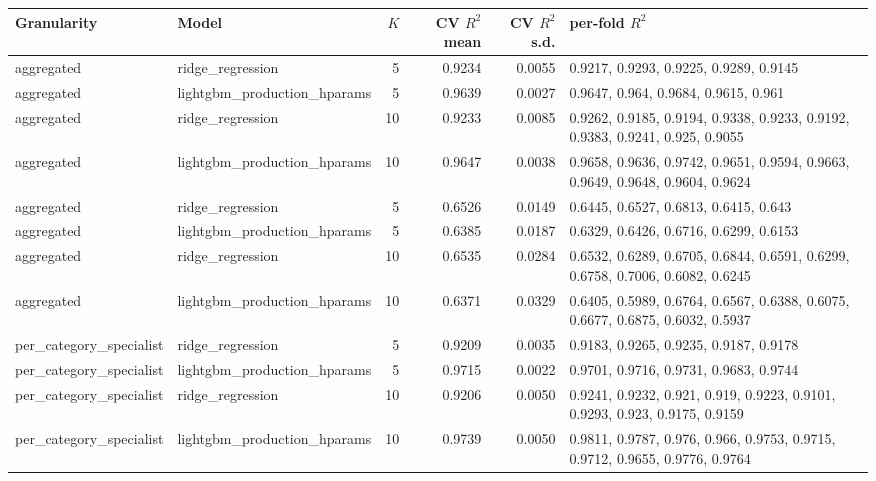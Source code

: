 \begin{tabular}{llrrrl}
\toprule
Granularity & Model & $K$ & CV $R^2$ mean & CV $R^2$ s.d. & per-fold $R^2$ \\
\midrule
aggregated & ridge\_regression & 5 & 0.9234 & 0.0055 & {\scriptsize 0.9217, 0.9293, 0.9225, 0.9289, 0.9145} \\
aggregated & lightgbm\_production\_hparams & 5 & 0.9639 & 0.0027 & {\scriptsize 0.9647, 0.964, 0.9684, 0.9615, 0.961} \\
aggregated & ridge\_regression & 10 & 0.9233 & 0.0085 & {\scriptsize 0.9262, 0.9185, 0.9194, 0.9338, 0.9233, 0.9192, 0.9383, 0.9241, 0.925, 0.9055} \\
aggregated & lightgbm\_production\_hparams & 10 & 0.9647 & 0.0038 & {\scriptsize 0.9658, 0.9636, 0.9742, 0.9651, 0.9594, 0.9663, 0.9649, 0.9648, 0.9604, 0.9624} \\
aggregated & ridge\_regression & 5 & 0.6526 & 0.0149 & {\scriptsize 0.6445, 0.6527, 0.6813, 0.6415, 0.643} \\
aggregated & lightgbm\_production\_hparams & 5 & 0.6385 & 0.0187 & {\scriptsize 0.6329, 0.6426, 0.6716, 0.6299, 0.6153} \\
aggregated & ridge\_regression & 10 & 0.6535 & 0.0284 & {\scriptsize 0.6532, 0.6289, 0.6705, 0.6844, 0.6591, 0.6299, 0.6758, 0.7006, 0.6082, 0.6245} \\
aggregated & lightgbm\_production\_hparams & 10 & 0.6371 & 0.0329 & {\scriptsize 0.6405, 0.5989, 0.6764, 0.6567, 0.6388, 0.6075, 0.6677, 0.6875, 0.6032, 0.5937} \\
per\_category\_specialist & ridge\_regression & 5 & 0.9209 & 0.0035 & {\scriptsize 0.9183, 0.9265, 0.9235, 0.9187, 0.9178} \\
per\_category\_specialist & lightgbm\_production\_hparams & 5 & 0.9715 & 0.0022 & {\scriptsize 0.9701, 0.9716, 0.9731, 0.9683, 0.9744} \\
per\_category\_specialist & ridge\_regression & 10 & 0.9206 & 0.0050 & {\scriptsize 0.9241, 0.9232, 0.921, 0.919, 0.9223, 0.9101, 0.9293, 0.923, 0.9175, 0.9159} \\
per\_category\_specialist & lightgbm\_production\_hparams & 10 & 0.9739 & 0.0050 & {\scriptsize 0.9811, 0.9787, 0.976, 0.966, 0.9753, 0.9715, 0.9712, 0.9655, 0.9776, 0.9764} \\
\bottomrule
\end{tabular}